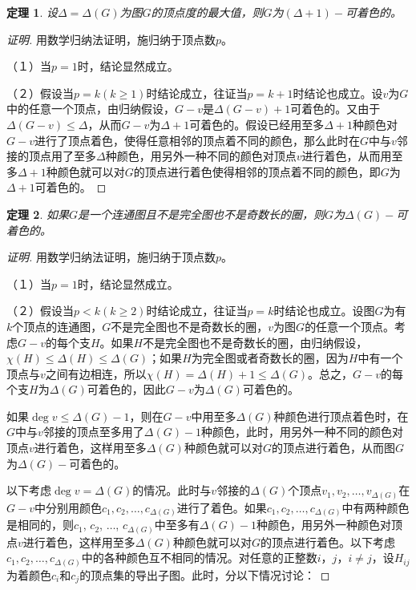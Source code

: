 \documentclass{article}
\newtheorem{Thm}{定理}
\begin{document}
\begin{CJK*}{UTF8}{gbsn}
  \begin{Thm}
    设$\Delta = \Delta (G)$为图$G$的顶点度的最大值，则$G$为$(\Delta+1)-$可着色的。
  \end{Thm}
  \begin{proof}[证明]用数学归纳法证明，施归纳于顶点数$p$。

    （１）当$p=1$时，结论显然成立。

    （２）假设当$p=k(k\geq 1)$时结论成立，往证当$p=k+1$时结论也成立。设$v$为$G$中的任意一个顶点，由归纳假设，$G-v$是$\Delta(G-v)+1$可着色的。又由于$\Delta(G-v) \leq \Delta$，从而$G-v$为$\Delta+1$可着色的。假设已经用至多$\Delta+1$种颜色对$G-v$进行了顶点着色，使得任意相邻的顶点着不同的颜色，那么此时在$G$中与$v$邻接的顶点用了至多$\Delta$种颜色，用另外一种不同的颜色对顶点$v$进行着色，从而用至多$\Delta+1$种颜色就可以对$G$的顶点进行着色使得相邻的顶点着不同的颜色，即$G$为$\Delta + 1$可着色的。
    
  \end{proof}
  \clearpage
  \begin{Thm}
    如果$G$是一个连通图且不是完全图也不是奇数长的圈，则$G$为$\Delta(G)-$可着色的。
  \end{Thm}

  \begin{proof}[证明]
    用数学归纳法证明，施归纳于顶点数$p$。

   （１）当$p=1$时，结论显然成立。

   （２）假设当$p<k(k\geq 2)$时结论成立，往证当$p=k$时结论也成立。设图$G$为有$k$个顶点的连通图，$G$不是完全图也不是奇数长的圈，$v$为图$G$的任意一个顶点。考虑$G-v$的每个支$H$。如果$H$不是完全图也不是奇数长的圈，由归纳假设，$\chi(H)\leq \Delta(H) \leq \Delta(G)$；如果$H$为完全图或者奇数长的圈，因为$H$中有一个顶点与$v$之间有边相连，所以$\chi(H) = \Delta(H) + 1 \leq \Delta(G)$。总之，$G-v$的每个支$H$为$\Delta(G)$可着色的，因此$G-v$为$\Delta(G)$可着色的。

   如果$\deg v \leq \Delta(G)-1$，则在$G-v$中用至多$\Delta(G)$种颜色进行顶点着色时，在$G$中与$v$邻接的顶点至多用了$\Delta(G)-1$种颜色，此时，用另外一种不同的颜色对顶点$v$进行着色，这样用至多$\Delta(G)$种颜色就可以对$G$的顶点进行着色，从而图$G$为$\Delta(G)-$可着色的。

   以下考虑$\deg v = \Delta(G)$的情况。此时与$v$邻接的$\Delta(G)$个顶点$v_1,v_2,\ldots,v_{\Delta(G)}$在$G-v$中分别用颜色$c_1,c_2,\ldots,c_{\Delta(G)}$进行了着色。如果$c_1,c_2,\ldots,c_{\Delta(G)}$中有两种颜色是相同的，则$c_1$, $c_2$, $\ldots$, $c_{\Delta(G)}$中至多有$\Delta(G)-1$种颜色，用另外一种颜色对顶点$v$进行着色，这样用至多$\Delta(G)$种颜色就可以对$G$的顶点进行着色。以下考虑$c_1,c_2,\ldots,c_{\Delta(G)}$中的各种颜色互不相同的情况。对任意的正整数$i$，$j$，$i\neq j$，设$H_{ij}$为着颜色$c_i$和$c_j$的顶点集的导出子图。此时，分以下情况讨论：


\end{proof}
\end{CJK*}
\end{document}
